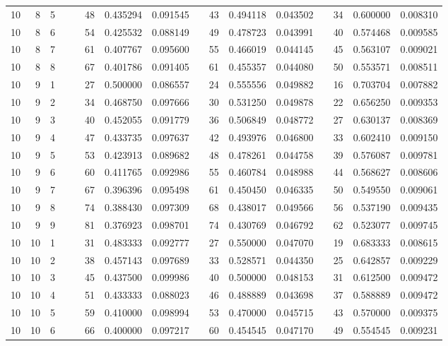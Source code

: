 \begin{appendix}
\begin{longtable}[h]{rrrccccccccccccc}
10	&	8	&	5	&&&	48	&	0.435294	&	0.091545	&&	43	&	0.494118	&	0.043502	&&	34	&	0.600000	&	0.008310	\\
10	&	8	&	6	&&&	54	&	0.425532	&	0.088149	&&	49	&	0.478723	&	0.043991	&&	40	&	0.574468	&	0.009585	\\
10	&	8	&	7	&&&	61	&	0.407767	&	0.095600	&&	55	&	0.466019	&	0.044145	&&	45	&	0.563107	&	0.009021	\\
10	&	8	&	8	&&&	67	&	0.401786	&	0.091405	&&	61	&	0.455357	&	0.044080	&&	50	&	0.553571	&	0.008511	\\
10	&	9	&	1	&&&	27	&	0.500000	&	0.086557	&&	24	&	0.555556	&	0.049882	&&	16	&	0.703704	&	0.007882	\\
10	&	9	&	2	&&&	34	&	0.468750	&	0.097666	&&	30	&	0.531250	&	0.049878	&&	22	&	0.656250	&	0.009353	\\
10	&	9	&	3	&&&	40	&	0.452055	&	0.091779	&&	36	&	0.506849	&	0.048772	&&	27	&	0.630137	&	0.008369	\\
10	&	9	&	4	&&&	47	&	0.433735	&	0.097637	&&	42	&	0.493976	&	0.046800	&&	33	&	0.602410	&	0.009150	\\
10	&	9	&	5	&&&	53	&	0.423913	&	0.089682	&&	48	&	0.478261	&	0.044758	&&	39	&	0.576087	&	0.009781	\\
10	&	9	&	6	&&&	60	&	0.411765	&	0.092986	&&	55	&	0.460784	&	0.048988	&&	44	&	0.568627	&	0.008606	\\
10	&	9	&	7	&&&	67	&	0.396396	&	0.095498	&&	61	&	0.450450	&	0.046335	&&	50	&	0.549550	&	0.009061	\\
10	&	9	&	8	&&&	74	&	0.388430	&	0.097309	&&	68	&	0.438017	&	0.049566	&&	56	&	0.537190	&	0.009435	\\
10	&	9	&	9	&&&	81	&	0.376923	&	0.098701	&&	74	&	0.430769	&	0.046792	&&	62	&	0.523077	&	0.009745	\\
10	&	10	&	1	&&&	31	&	0.483333	&	0.092777	&&	27	&	0.550000	&	0.047070	&&	19	&	0.683333	&	0.008615	\\
10	&	10	&	2	&&&	38	&	0.457143	&	0.097689	&&	33	&	0.528571	&	0.044350	&&	25	&	0.642857	&	0.009229	\\
10	&	10	&	3	&&&	45	&	0.437500	&	0.099986	&&	40	&	0.500000	&	0.048153	&&	31	&	0.612500	&	0.009472	\\
10	&	10	&	4	&&&	51	&	0.433333	&	0.088023	&&	46	&	0.488889	&	0.043698	&&	37	&	0.588889	&	0.009472	\\
10	&	10	&	5	&&&	59	&	0.410000	&	0.098994	&&	53	&	0.470000	&	0.045715	&&	43	&	0.570000	&	0.009375	\\
10	&	10	&	6	&&&	66	&	0.400000	&	0.097217	&&	60	&	0.454545	&	0.047170	&&	49	&	0.554545	&	0.009231	\\

\end{longtable}
\end{appendix}
